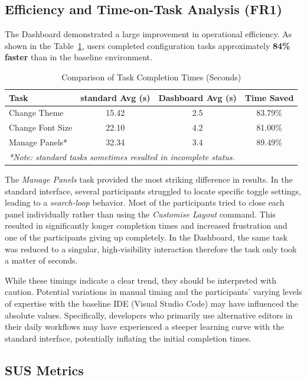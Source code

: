 \subsection{Efficiency and Time-on-Task Analysis (FR1)}
The Dashboard demonstrated a large improvement in operational efficiency. As shown in the Table~\ref{tab:time_savings}, users completed configuration
 tasks approximately \textbf{84\% faster} than in the baseline environment.

\begin{table}[h]
\centering
\caption{Comparison of Task Completion Times (Seconds)}
\label{tab:time_savings}
\begin{tabular}{@{}lccc@{}}
\toprule
\textbf{Task} & \textbf{standard Avg (s)} & \textbf{Dashboard Avg (s)} & \textbf{Time Saved} \\ \midrule
Change Theme         & 15.42 & 2.5 & 83.79\% \\
Change Font Size     & 22.10 & 4.2 & 81.00\% \\
Manage Panels* & 32.34 & 3.4 & 89.49\% \\ \bottomrule
\multicolumn{4}{l}{\small \textit{*Note: standard tasks sometimes resulted in incomplete status.}}
\end{tabular}
\end{table}

The \textit{Manage Panels} task provided the most striking difference in results. In the standard interface, several participants struggled to locate specific toggle 
settings, leading to a \textit{search-loop} behavior. Most of the participants tried to close each panel individually rather than using the \textit{Customise Layout} command.
 This resulted in significantly longer completion times and increased frustration and one of the participants giving up completely. 
In the Dashboard, the same task was reduced to a singular, high-visibility interaction therefore the task only took a matter of seconds.

While these timings indicate a clear trend, they should be interpreted with caution. Potential variations in manual timing and the participants'
 varying levels of expertise with the baseline \gls{IDE} (Visual Studio Code) may have influenced the absolute values. 
 Specifically, developers who primarily use alternative editors in their daily workflows may have experienced a steeper learning curve with the standard interface,
  potentially inflating the initial completion times.


\subsection{SUS Metrics}

